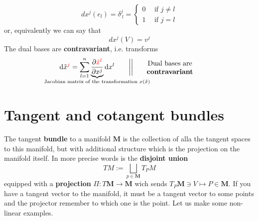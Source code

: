 \documentclass[../main.tex]{subfiles}
\begin{document}
\[
dx^j(e_l)=\delta^j_{\ l}=
\begin{cases}
0 \ & \ \textrm{if } j\neq l\\
1 \ & \ \textrm{if } j= l
\end{cases}
\]
or, equivalently we can say that
\[
dx^j(V)=v^j
\]
The dual bases are \textbf{contravariant}, i.e. transforms
\[
\textrm{d}\tilde{x}^{\textcolor{red}{j}}=\sum_{l=1}^n\underbrace{\frac{\partial \textcolor{red}{\tilde{x}^l}}{\partial{{x}^j}}}_{\mathclap{\text{Jacobian matrix of the transformation $x(\tilde{x})$}}}\textrm{d}x^l \qquad \bigg|\bigg| \quad \text{\parbox{3 cm}{\centering Dual bases are \textbf{contravariant}}}
\]
\section{Tangent and cotangent bundles}
The tangent \textbf{bundle} to a manifold $\mathbf{M}$ is the collection of alla the tangent spaces to this manifold, but with additional structure which is the projection on the manifold itself. In more precise words is the \textbf{disjoint union}
\[
TM := \bigsqcup_{p\in\mathbf{M}}T_PM
\]
equipped with a \textbf{projection} $\Pi: T\mathbf{M}\to\mathbf{M}$ wich sends $T_P\mathbf{M}\ni V \mapsto P\in\mathbf{M}$. If you have a tangent vector to the manifold, it must be a tangent vector to some points and the projector remember to which one is the point. Let us make some non-linear examples.
\end{document}
